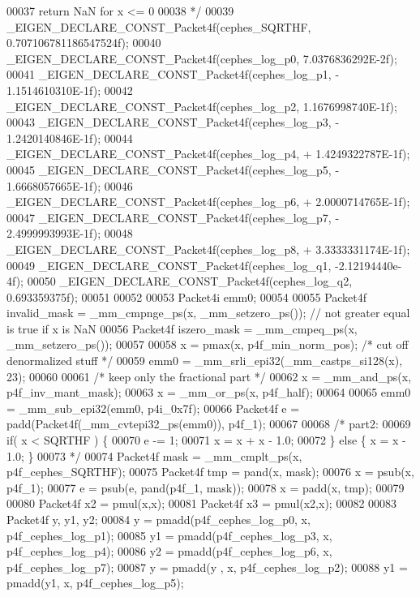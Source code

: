 \begin{DoxyCode}
00037 \textcolor{comment}{    return NaN for x <= 0}
00038 \textcolor{comment}{  */}
00039   \_EIGEN\_DECLARE\_CONST\_Packet4f(cephes\_SQRTHF, 0.707106781186547524f);
00040   \_EIGEN\_DECLARE\_CONST\_Packet4f(cephes\_log\_p0, 7.0376836292E-2f);
00041   \_EIGEN\_DECLARE\_CONST\_Packet4f(cephes\_log\_p1, - 1.1514610310E-1f);
00042   \_EIGEN\_DECLARE\_CONST\_Packet4f(cephes\_log\_p2, 1.1676998740E-1f);
00043   \_EIGEN\_DECLARE\_CONST\_Packet4f(cephes\_log\_p3, - 1.2420140846E-1f);
00044   \_EIGEN\_DECLARE\_CONST\_Packet4f(cephes\_log\_p4, + 1.4249322787E-1f);
00045   \_EIGEN\_DECLARE\_CONST\_Packet4f(cephes\_log\_p5, - 1.6668057665E-1f);
00046   \_EIGEN\_DECLARE\_CONST\_Packet4f(cephes\_log\_p6, + 2.0000714765E-1f);
00047   \_EIGEN\_DECLARE\_CONST\_Packet4f(cephes\_log\_p7, - 2.4999993993E-1f);
00048   \_EIGEN\_DECLARE\_CONST\_Packet4f(cephes\_log\_p8, + 3.3333331174E-1f);
00049   \_EIGEN\_DECLARE\_CONST\_Packet4f(cephes\_log\_q1, -2.12194440e-4f);
00050   \_EIGEN\_DECLARE\_CONST\_Packet4f(cephes\_log\_q2, 0.693359375f);
00051 
00052 
00053   Packet4i emm0;
00054 
00055   Packet4f invalid\_mask = \_mm\_cmpnge\_ps(x, \_mm\_setzero\_ps()); \textcolor{comment}{// not greater equal is true if x is NaN}
00056   Packet4f iszero\_mask = \_mm\_cmpeq\_ps(x, \_mm\_setzero\_ps());
00057 
00058   x = pmax(x, p4f\_min\_norm\_pos);  \textcolor{comment}{/* cut off denormalized stuff */}
00059   emm0 = \_mm\_srli\_epi32(\_mm\_castps\_si128(x), 23);
00060 
00061   \textcolor{comment}{/* keep only the fractional part */}
00062   x = \_mm\_and\_ps(x, p4f\_inv\_mant\_mask);
00063   x = \_mm\_or\_ps(x, p4f\_half);
00064 
00065   emm0 = \_mm\_sub\_epi32(emm0, p4i\_0x7f);
00066   Packet4f e = padd(Packet4f(\_mm\_cvtepi32\_ps(emm0)), p4f\_1);
00067 
00068   \textcolor{comment}{/* part2:}
00069 \textcolor{comment}{     if( x < SQRTHF ) \{}
00070 \textcolor{comment}{       e -= 1;}
00071 \textcolor{comment}{       x = x + x - 1.0;}
00072 \textcolor{comment}{     \} else \{ x = x - 1.0; \}}
00073 \textcolor{comment}{  */}
00074   Packet4f mask = \_mm\_cmplt\_ps(x, p4f\_cephes\_SQRTHF);
00075   Packet4f tmp = pand(x, mask);
00076   x = psub(x, p4f\_1);
00077   e = psub(e, pand(p4f\_1, mask));
00078   x = padd(x, tmp);
00079 
00080   Packet4f x2 = pmul(x,x);
00081   Packet4f x3 = pmul(x2,x);
00082 
00083   Packet4f y, y1, y2;
00084   y  = pmadd(p4f\_cephes\_log\_p0, x, p4f\_cephes\_log\_p1);
00085   y1 = pmadd(p4f\_cephes\_log\_p3, x, p4f\_cephes\_log\_p4);
00086   y2 = pmadd(p4f\_cephes\_log\_p6, x, p4f\_cephes\_log\_p7);
00087   y  = pmadd(y , x, p4f\_cephes\_log\_p2);
00088   y1 = pmadd(y1, x, p4f\_cephes\_log\_p5);

\end{DoxyCode}

